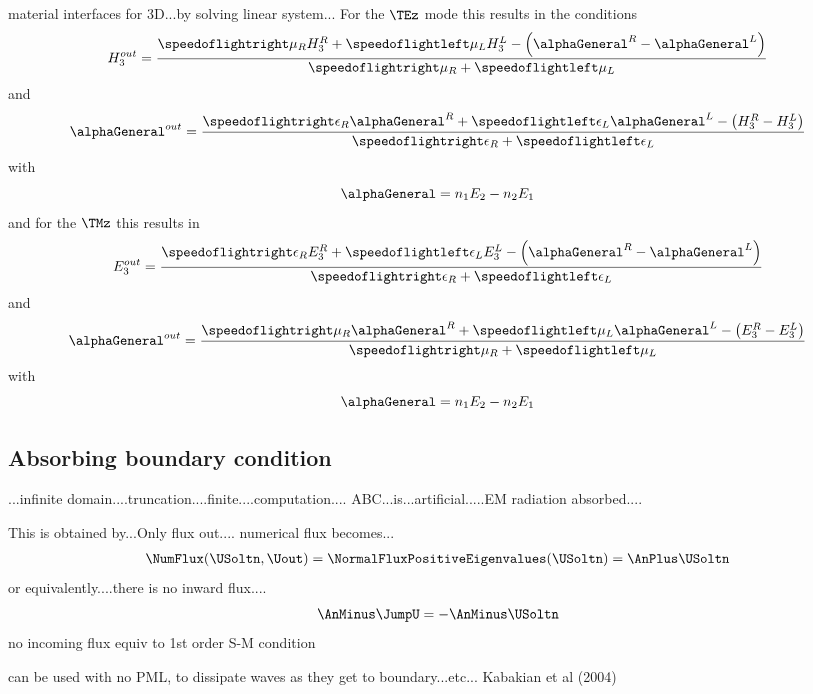 material interfaces for 3D...by solving linear system...
For the $\TEz$ mode this results in the conditions
\begin{equation}
H_3^{out} = \frac{\speedoflightright \mu_R H_3^R + \speedoflightleft \mu_L H_3^L - \left(\alphaGeneral^R - \alphaGeneral^L \right)}{\speedoflightright \mu_R + \speedoflightleft \mu_L } \label{eq:interface-bc-V3}
\end{equation}
and
\begin{equation}
\alphaGeneral^{out} = \frac{\speedoflightright \epsilon_R \alphaGeneral^R + \speedoflightleft \epsilon_L \alphaGeneral^L - \left( H_3^R - H_3^L \right) }{\speedoflightright \epsilon_R + \speedoflightleft \epsilon_L}
\end{equation}
with
$$ \alphaGeneral = n_1 E_2 - n_2 E_1 $$
and for the $\TMz$ this results in 
\begin{equation}
E_3^{out} = \frac{\speedoflightright \epsilon_R E_3^R + \speedoflightleft \epsilon_L E_3^L - \left(\alphaGeneral^R - \alphaGeneral^L \right)}{\speedoflightright \epsilon_R + \speedoflightleft \epsilon_L }
\end{equation}
and
\begin{equation}
\alphaGeneral^{out} = \frac{\speedoflightright \mu_R \alphaGeneral^R + \speedoflightleft \mu_L \alphaGeneral^L - \left( E_3^R - E_3^L \right) }{\speedoflightright \mu_R + \speedoflightleft \mu_L}
\end{equation}
with $$ \alphaGeneral = n_1 E_2 - n_2 E_1 $$

\subsection{Absorbing boundary condition}
...infinite
domain....truncation....finite....computation....
ABC...is...artificial.....EM radiation absorbed....

This is obtained by...Only flux out....
numerical flux becomes...
\begin{align}
\NumFlux(\USoltn,\Uout) = \NormalFluxPositiveEigenvalues(\USoltn) = \AnPlus \USoltn
\end{align}
or equivalently....there is no inward flux....
$$
\AnMinus \JumpU = - \AnMinus \USoltn
$$
no incoming flux equiv to 1st order S-M condition

can be used with no PML, to dissipate waves as they get to boundary...etc...
Kabakian et al (2004)

